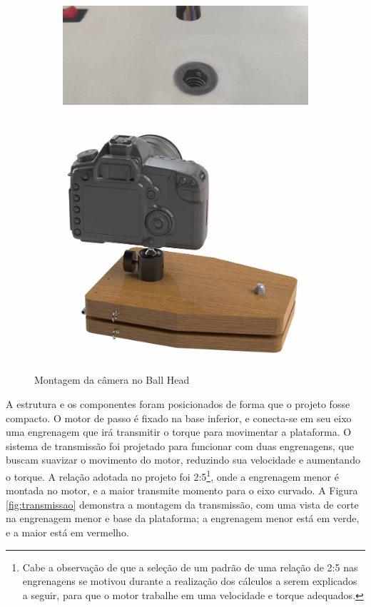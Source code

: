 \begin{figure}[!htb]
\begin{subfigure}[b]{0.74\textwidth}
		\centering
		\includegraphics[width=\textwidth]{figuras/desPlataforma/insertoMontagem}
		\caption{}
		\label{fig:insertoMontagem}
	\end{subfigure}
	
\end{figure}

\begin{figure}[!htb]
	\centering
	\caption{Montagem da câmera no Ball Head}
	\includegraphics[width=.6\linewidth]{figuras/desPlataforma/montagemCamera}
	\label{fig:renderMontagemCamera}
\end{figure}

A estrutura e os componentes foram posicionados de forma que o projeto fosse compacto. O motor de passo é fixado na base inferior, e conecta-se em seu eixo uma engrenagem que irá transmitir o torque para movimentar a plataforma. O sistema de transmissão foi projetado para funcionar com duas engrenagens, que buscam suavizar o movimento do motor, reduzindo sua velocidade e aumentando o torque. A relação adotada no projeto foi 2:5\footnote{Cabe a observação de que a seleção de um padrão de uma relação de 2:5 nas engrenagens se motivou durante a realização dos cálculos a serem explicados a seguir, para que o motor trabalhe em uma velocidade e torque adequados. }, onde a engrenagem menor é montada no motor, e a maior transmite momento para o eixo curvado. A Figura \ref{fig:transmissao} demonstra a montagem da transmissão, com uma vista de corte na engrenagem menor e base da plataforma; a engrenagem menor está em verde, e a maior está em vermelho.

